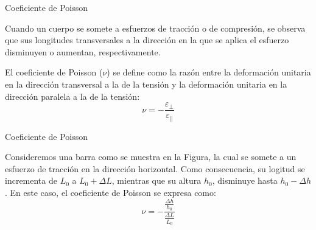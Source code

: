 \documentclass[11pt,handout,aspectratio=1610]{beamer}
\newcommand{\vs}{\vspace{11pt}}
\begin{document}
\begin{frame}{Coeficiente de Poisson}

    Cuando un cuerpo se somete a esfuerzos de tracción o de compresión, se observa que sus longitudes transversales a la dirección en la que se aplica el esfuerzo disminuyen o aumentan, respectivamente.

    \vs

    El coeficiente de Poisson ($\nu$) se define como la razón entre la deformación unitaria en la dirección transversal a la de la tensión y la deformación unitaria en la dirección paralela a la de la tensión: $$ \nu = - \frac{\varepsilon_\perp}{\varepsilon_\parallel} $$

\end{frame}

\begin{frame}{Coeficiente de Poisson}

    Consideremos una barra como se muestra en la Figura, la cual se somete a un esfuerzo de tracción en la dirección horizontal. Como consecuencia, su logitud se incrementa de $L_0$ a $L_0 + \Delta L$, mientras que su altura $h_0$, disminuye hasta $h_0 - \Delta h$. En este caso, el coeficiente de Poisson se expresa como: $$ \nu = - \frac{\frac{\Delta h}{h_0}}{\frac{\Delta L}{L_0}} $$

    \begin{figure}
        \centering
    \end{figure}

\end{frame}
\end{document}
